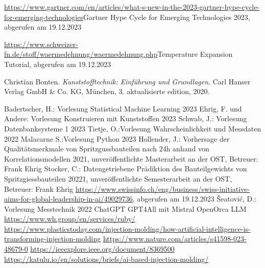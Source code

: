 


\begin{thebibliography}{9}

 \url{https://www.gartner.com/en/articles/what-s-new-in-the-2023-gartner-hype-cycle-for-emerging-technologies}{Gartner Hype Cycle for Emerging Technologies 2023}, abgerufen am 19.12.2023

  \url{https://www.schweizer-fn.de/stoff/waermedehnung/waermedehnung.php}{Temperature Expansion Tutorial}, abgerufen am 19.12.2023

   Christian Bonten. \textit{Kunststofftechnik: Einführung und Grundlagen}. Carl Hanser Verlag GmbH \& Co. KG, München, 3. aktualisierte edition, 2020.

 Badertscher, H.: Vorlesung Statistical Machine Learning 2023
 Ehrig, F. und Andere: Vorlesung Konstruieren mit Kunststoffen 2023
 Schwab, J.: Vorlesung Datenbanksysteme 1 2023
 Tietje, O.:Vorlesung Wahrscheinlichkeit und Messdaten 2022
 Malacarne S.:Vorlesung Python 2023
 Hollender, J.: Vorhersage der Qualitätsmerkmale von Spritzgussbauteilen nach 24h anhand von Korrelationsmodellen 2021, unveröffentlichte Masterarbeit an der OST, Betreuer: Frank Ehrig
 Stocker, C.: Datengetriebene Prädiktion des Bauteilgewichts von Spritzgiessbauteilen 20221, unveröffentlichte Semesterarbeit an der OST, Betreuer: Frank Ehrig
 \url{https://www.swissinfo.ch/eng/business/swiss-initiative-aims-for-global-leadership-in-ai/49029736}, abgerufen am 19.12.2023
 Šeatović, D.: Vorlesung Messtechnik 2022
 ChatGPT
 GPT4All mit Mistral OpenOrca LLM
 \url{https://www.wh.group/en/services/ruby/}
 \url{https://www.plasticstoday.com/injection-molding/how-artificial-intelligence-is-transforming-injection-molding}
 \url{https://www.nature.com/articles/s41598-023-48679-0}
 \url{https://ieeexplore.ieee.org/document/8369500}
 \url{https://katulu.io/en/solutions/briefs/ai-based-injection-molding/}

\end{thebibliography}

